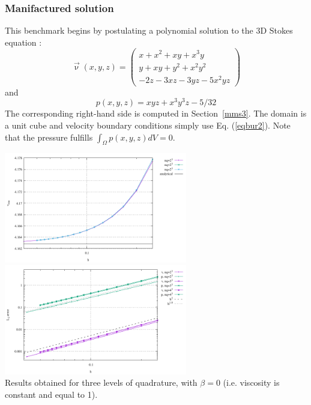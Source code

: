 


\subsubsection*{Manifactured solution}

This benchmark begins by postulating a polynomial solution 
to the 3D Stokes equation \cite{dobo04}:
\begin{equation}
\vec{\upnu}(x,y,z)
=
\left(
\begin{array}{c}
x+x^2+xy+x^3y \\
y + xy + y^2 + x^2 y^2\\
-2z - 3xz - 3yz - 5x^2 yz
\end{array}
\right)
\label{eqbur2}
\end{equation}
and
\begin{equation}
p(x,y,z) = xyz + x^3 y^3z - 5/32
\end{equation}
The corresponding right-hand side is computed in Section~\ref{mms3}.
The domain is a unit cube and velocity boundary conditions
simply use Eq. (\ref{eqbur2}).
Note that the pressure fulfills $\int_\Omega p(x,y,z) dV = 0.$

\begin{center}
\includegraphics[width=8cm]{python_codes/fieldstone_82/results/mms/vrms.pdf}
\includegraphics[width=8cm]{python_codes/fieldstone_82/results/mms/conv.pdf}\\
{\captionfont Results obtained for three levels of quadrature, with $\beta=0$ (i.e.
viscosity is constant and equal to 1).}
\end{center}

